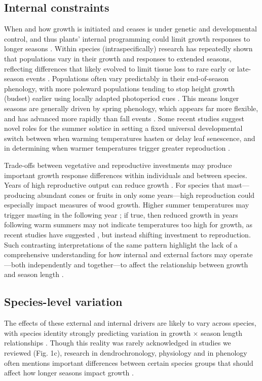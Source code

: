 \documentclass[11pt]{article}
\begin{document}
\subsection*{Internal constraints}
When and how growth is initiated and ceases is under genetic and developmental control, and thus plants' internal programming could limit growth responses to longer seasons \citep{howe2003genotype}. Within species (intraspecifically) research has repeatedly shown that populations vary in their growth and responses to extended seasons, reflecting differences that likely evolved to limit tissue loss to rare early or late-season events \citep{mitton2012mountain,lange2006thresholds,cleland2024effects}. Populations often vary predictably in their end-of-season phenology, with more poleward populations tending to stop height growth (budset) earlier using locally adapted photoperiod cues \citep{soolanayakanahally2013timing,aitken2016}. This means longer seasons are generally driven by spring phenology, which appears far more flexible, and has advanced more rapidly than fall events \citep{aitken2016}. Some recent studies suggest novel roles for the summer solstice \citep{zohner2023effect} in setting a fixed universal developmental switch between when warming temperatures hasten or delay leaf senescence, and in determining when warmer temperatures trigger greater reproduction \citep{Journe2024}. 

Trade-offs between vegetative and reproductive investments may produce important growth response differences within individuals and  between species. Years of high reproductive output can reduce growth \citep{thomas2011bookchptr,hacket2016tree}. For species that mast---producing abundant cones or fruits in only some years---high reproduction could especially impact measures of wood growth. Higher summer temperatures may trigger masting in the following year \citep{hacket2016tree,hacket2016consistent}; if true, then reduced growth in years following warm summers may not indicate temperatures too high for growth, as recent studies have suggested \citep[e.g.][]{gantois2022new,dow2022warm}, but instead shifting investment to reproduction. Such contrasting interpretations of the same pattern highlight the lack of a comprehensive understanding for how internal and external factors may operate---both independently and together---to affect the relationship between growth and season length \citep[see Box,][]{korner2015paradigm}.

\subsection*{Species-level variation}
The effects of these external and internal drivers are likely to vary across species, with species identity strongly predicting variation in growth $\times$ season length relationships \citep[e.g.][]{cuny2012life,michelot2012comparing}. Though this reality was rarely acknowledged in studies we reviewed (Fig. 1c), research in dendrochronology, physiology and in phenology often mentions important differences between certain species groups that should affect how longer seasons impact growth \citep{camarero2015or,fu2019nutrient,puchalka2024tree}. 
\end{document}
